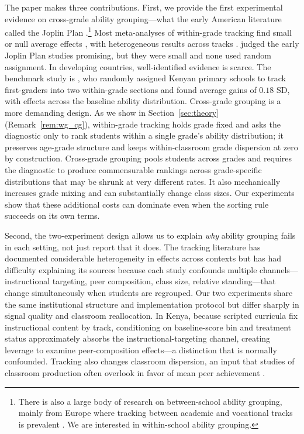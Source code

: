 \documentclass[11pt]{article}
\begin{document}
The paper makes three contributions. First, we provide the first experimental evidence on cross-grade ability grouping---what the early American literature called the Joplin Plan \citep{floyd:1954}.\footnote{There is also a large body of research on between-school ability grouping, mainly from Europe where tracking between academic and vocational tracks is prevalent \citep{fu2018ability,lavrijsen2015new}. We are interested in within-school ability grouping.} Most meta-analyses of within-grade tracking find small or null average effects \citep{slavin:1987,slavin1990achievement,kulik1987effects,terrin2022effect}, with heterogeneous results across tracks \citep{burke2013classroom,hoxby2005taking,antecol2016peer,garlick,de2022college}. \citet{slavin:1987} judged the early Joplin Plan studies promising, but they were small and none used random assignment. In developing countries, well-identified evidence is scarce. The benchmark study is \citet{duflo2011peer}, who randomly assigned Kenyan primary schools to track first-graders into two within-grade sections and found average gains of $0.18$ SD, with effects across the baseline ability distribution. Cross-grade grouping is a more demanding design. As we show in Section~\ref{sec:theory} (Remark~\ref{rem:wg_cg}), within-grade tracking holds grade fixed and asks the diagnostic only to rank students within a single grade's ability distribution; it preserves age-grade structure and keeps within-classroom grade dispersion at zero by construction. Cross-grade grouping pools students across grades and requires the diagnostic to produce commensurable rankings across grade-specific distributions that may be shrunk at very different rates. It also mechanically increases grade mixing and can substantially change class sizes. Our experiments show that these additional costs can dominate even when the sorting rule succeeds on its own terms.

Second, the two-experiment design allows us to explain \emph{why} ability grouping fails in each setting, not just report that it does. The tracking literature has documented considerable heterogeneity in effects across contexts \citep{betts:2011,card2016can,vardardottir2013peer} but has had difficulty explaining its sources because each study confounds multiple channels---instructional targeting, peer composition, class size, relative standing---that change simultaneously when students are regrouped. Our two experiments share the same institutional structure and implementation protocol but differ sharply in signal quality and classroom reallocation. In Kenya, because scripted curricula fix instructional content by track, conditioning on baseline-score bin and treatment status approximately absorbs the instructional-targeting channel, creating leverage to examine peer-composition effects---a distinction that is normally confounded. Tracking also changes classroom dispersion, an input that studies of classroom production often overlook in favor of mean peer achievement \citep{rjosk2022dispersion,vigdor2007peer,duflo2011peer}.
\end{document}
